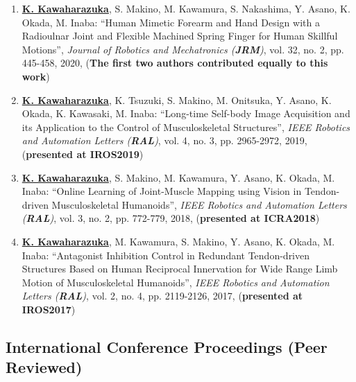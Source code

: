 \documentclass[letterpaper]{article}
\begin{document}
\begin{enumerate}
\item \underline{\textbf{K. Kawaharazuka}}, S. Makino, M. Kawamura, S. Nakashima, Y. Asano, K. Okada, M. Inaba: ``Human Mimetic Forearm and Hand Design with a Radioulnar Joint and Flexible Machined Spring Finger for Human Skillful Motions'', \textit{Journal of Robotics and Mechatronics (\textit{\textbf{JRM}})}, vol. 32, no. 2, pp. 445-458, 2020, (\textbf{The first two authors contributed equally to this work})
\item \underline{\textbf{K. Kawaharazuka}}, K. Tsuzuki, S. Makino, M. Onitsuka, Y. Asano, K. Okada, K. Kawasaki, M. Inaba: ``Long-time Self-body Image Acquisition and its Application to the Control of Musculoskeletal Structures'', \textit{IEEE Robotics and Automation Letters (\textit{\textbf{RAL}})}, vol. 4, no. 3, pp. 2965-2972, 2019, (\textbf{presented at IROS2019})
\item \underline{\textbf{K. Kawaharazuka}}, S. Makino, M. Kawamura, Y. Asano, K. Okada, M. Inaba: ``Online Learning of Joint-Muscle Mapping using Vision in Tendon-driven Musculoskeletal Humanoids'', \textit{IEEE Robotics and Automation Letters (\textit{\textbf{RAL}})}, vol. 3, no. 2, pp. 772-779, 2018, (\textbf{presented at ICRA2018})
\item \underline{\textbf{K. Kawaharazuka}}, M. Kawamura, S. Makino, Y. Asano, K. Okada, M. Inaba: ``Antagonist Inhibition Control in Redundant Tendon-driven Structures Based on Human Reciprocal Innervation for Wide Range Limb Motion of Musculoskeletal Humanoids'', \textit{IEEE Robotics and Automation Letters (\textit{\textbf{RAL}})}, vol. 2, no. 4, pp. 2119-2126, 2017, (\textbf{presented at IROS2017})
\end{enumerate}

\subsection*{International Conference Proceedings (Peer Reviewed)}
\end{document}
